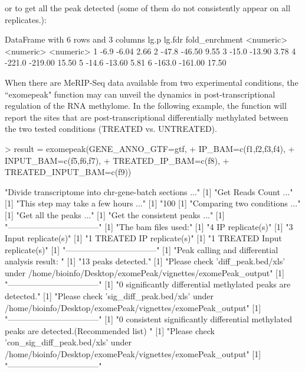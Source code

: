 \documentclass[]{article}
\begin{document}
 or to get all the peak detected (some of them do not consistently appear on all replicates.):
 
\begin{Schunk}
\begin{Soutput}
DataFrame with 6 rows and 3 columns
       lg.p    lg.fdr fold_enrchment
  <numeric> <numeric>      <numeric>
1      -6.9     -6.04           2.66
2     -47.8    -46.50           9.55
3     -15.0    -13.90           3.78
4    -221.0   -219.00          15.50
5     -14.6    -13.60           5.81
6    -163.0   -161.00          17.50
\end{Soutput}
\end{Schunk}

When there are MeRIP-Seq data available from two experimental conditions, the ``exomepeak" function may can unveil the dynamics in post-transcriptional regulation of the RNA methylome. In the following example, the function will report the sites that are post-transcriptional differentially methylated between the two tested conditions (TREATED vs. UNTREATED). 

\begin{Schunk}
\begin{Sinput}
> result = exomepeak(GENE_ANNO_GTF=gtf, 
+                    IP_BAM=c(f1,f2,f3,f4), 
+                    INPUT_BAM=c(f5,f6,f7),
+                    TREATED_IP_BAM=c(f8), 
+                    TREATED_INPUT_BAM=c(f9))
\end{Sinput}
\begin{Soutput}
[1] "Divide transcriptome into chr-gene-batch sections ..."
[1] "Get Reads Count ..."
[1] "This step may take a few hours ..."
[1] "100 %"
[1] "Comparing two conditions ..."
[1] "Get all the peaks ..."
[1] "Get the consistent peaks ..."
[1] "---------------------------------"
[1] "The bam files used:"
[1] "4 IP replicate(s)"
[1] "3 Input replicate(s)"
[1] "1 TREATED IP replicate(s)"
[1] "1 TREATED Input replicate(s)"
[1] "---------------------------------"
[1] "Peak calling and differential analysis result: "
[1] "13 peaks detected."
[1] "Please check 'diff_peak.bed/xls' under /home/bioinfo/Desktop/exomePeak/vignettes/exomePeak_output"
[1] "---------------------------------"
[1] "0 significantly differential methylated peaks are detected."
[1] "Please check 'sig_diff_peak.bed/xls' under /home/bioinfo/Desktop/exomePeak/vignettes/exomePeak_output"
[1] "---------------------------------"
[1] "0 consistent significantly differential methylated peaks are detected.(Recommended list) "
[1] "Please check 'con_sig_diff_peak.bed/xls' under /home/bioinfo/Desktop/exomePeak/vignettes/exomePeak_output"
[1] "---------------------------------"
\end{Soutput}
\end{Schunk}
\end{document}
